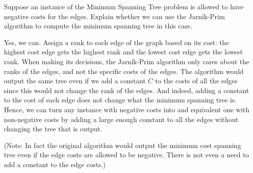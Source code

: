 \begin{flex}
\label{grp:exercise:MST-with-negative-costs}

\begin{exercise}
\label{exercise:MST-with-negative-costs}
Suppose an instance of the Minimum Spanning Tree problem is allowed to have negative costs for the edges. Explain whether we can use the Jarn\'{i}k-Prim algorithm to compute the minimum spanning tree in this case.

\end{exercise}

\begin{solution}
\label{sol:intro-to-graph-theory::assign}
Yes, we can. Assign a rank to each edge of the graph based on its cost: the highest cost edge gets the highest rank and the lowest cost edge gets the lowest rank. When making its decisions, the Jarn\'{i}k-Prim algorithm only cares about the ranks of the edges, and not the specific costs of the edges. The algorithm would output the same tree even if we add a constant $C$ to the costs of all the edges since this would not change the rank of the edges. And indeed, adding a constant to the cost of each edge does not change what the minimum spanning tree is. Hence, we can turn any instance with negative costs into and equivalent one with non-negative costs by adding a large enough constant to all the edges without changing the tree that is output.

\noindent
(Note: In fact the original algorithm would output the minimum cost spanning tree even if the edge costs are allowed to be negative. There is not even a need to add a constant to the edge costs.)

\end{solution}
\end{flex}

